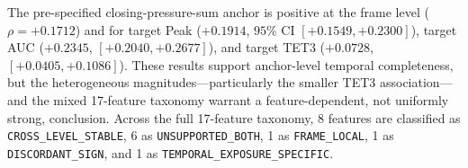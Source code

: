 The pre-specified closing-pressure-sum anchor is positive at the frame level ($\rho = +0.1712$) and for target Peak ($+0.1914$, $95\%$ CI $[+0.1549, +0.2300]$), target AUC ($+0.2345$, $[+0.2040, +0.2677]$), and target TET3 ($+0.0728$, $[+0.0405, +0.1086]$). These results support anchor-level temporal completeness, but the heterogeneous magnitudes---particularly the smaller TET3 association---and the mixed 17-feature taxonomy warrant a feature-dependent, not uniformly strong, conclusion. Across the full 17-feature taxonomy, 8 features are classified as \texttt{CROSS\_LEVEL\_STABLE}, 6 as \texttt{UNSUPPORTED\_BOTH}, 1 as \texttt{FRAME\_LOCAL}, 1 as \texttt{DISCORDANT\_SIGN}, and 1 as \texttt{TEMPORAL\_EXPOSURE\_SPECIFIC}.
